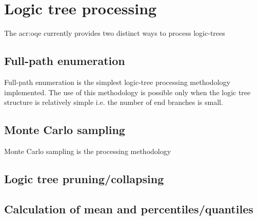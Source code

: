 \section{Logic tree processing}
The \gls{acr:oqe} currently provides two distinct ways to process logic-trees
%
\subsection{Full-path enumeration}
Full-path enumeration is the simplest logic-tree processing methodology
implemented. The use of this methodology is possible only when the logic tree
structure is relatively simple i.e. the number of end branches is small. 
%
\subsection{Monte Carlo sampling}
Monte Carlo sampling is the processing methodology 
%
\subsection{Logic tree pruning/collapsing}
\subsection{Calculation of mean and percentiles/quantiles}
